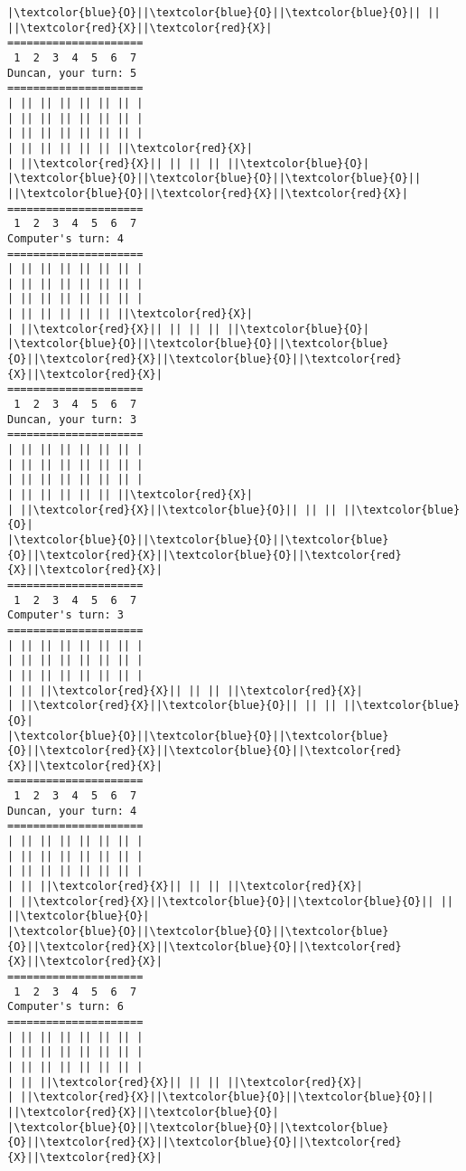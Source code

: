\documentclass{article}
\begin{document}
\begin{Verbatim}[commandchars=\\\{\}]
|\textcolor{blue}{O}||\textcolor{blue}{O}||\textcolor{blue}{O}|| || ||\textcolor{red}{X}||\textcolor{red}{X}|
=====================
 1  2  3  4  5  6  7
Duncan, your turn: 5
=====================
| || || || || || || |
| || || || || || || |
| || || || || || || |
| || || || || || ||\textcolor{red}{X}|
| ||\textcolor{red}{X}|| || || || ||\textcolor{blue}{O}|
|\textcolor{blue}{O}||\textcolor{blue}{O}||\textcolor{blue}{O}|| ||\textcolor{blue}{O}||\textcolor{red}{X}||\textcolor{red}{X}|
=====================
 1  2  3  4  5  6  7
Computer's turn: 4
=====================
| || || || || || || |
| || || || || || || |
| || || || || || || |
| || || || || || ||\textcolor{red}{X}|
| ||\textcolor{red}{X}|| || || || ||\textcolor{blue}{O}|
|\textcolor{blue}{O}||\textcolor{blue}{O}||\textcolor{blue}{O}||\textcolor{red}{X}||\textcolor{blue}{O}||\textcolor{red}{X}||\textcolor{red}{X}|
=====================
 1  2  3  4  5  6  7
Duncan, your turn: 3
=====================
| || || || || || || |
| || || || || || || |
| || || || || || || |
| || || || || || ||\textcolor{red}{X}|
| ||\textcolor{red}{X}||\textcolor{blue}{O}|| || || ||\textcolor{blue}{O}|
|\textcolor{blue}{O}||\textcolor{blue}{O}||\textcolor{blue}{O}||\textcolor{red}{X}||\textcolor{blue}{O}||\textcolor{red}{X}||\textcolor{red}{X}|
=====================
 1  2  3  4  5  6  7
Computer's turn: 3
=====================
| || || || || || || |
| || || || || || || |
| || || || || || || |
| || ||\textcolor{red}{X}|| || || ||\textcolor{red}{X}|
| ||\textcolor{red}{X}||\textcolor{blue}{O}|| || || ||\textcolor{blue}{O}|
|\textcolor{blue}{O}||\textcolor{blue}{O}||\textcolor{blue}{O}||\textcolor{red}{X}||\textcolor{blue}{O}||\textcolor{red}{X}||\textcolor{red}{X}|
=====================
 1  2  3  4  5  6  7
Duncan, your turn: 4
=====================
| || || || || || || |
| || || || || || || |
| || || || || || || |
| || ||\textcolor{red}{X}|| || || ||\textcolor{red}{X}|
| ||\textcolor{red}{X}||\textcolor{blue}{O}||\textcolor{blue}{O}|| || ||\textcolor{blue}{O}|
|\textcolor{blue}{O}||\textcolor{blue}{O}||\textcolor{blue}{O}||\textcolor{red}{X}||\textcolor{blue}{O}||\textcolor{red}{X}||\textcolor{red}{X}|
=====================
 1  2  3  4  5  6  7
Computer's turn: 6
=====================
| || || || || || || |
| || || || || || || |
| || || || || || || |
| || ||\textcolor{red}{X}|| || || ||\textcolor{red}{X}|
| ||\textcolor{red}{X}||\textcolor{blue}{O}||\textcolor{blue}{O}|| ||\textcolor{red}{X}||\textcolor{blue}{O}|
|\textcolor{blue}{O}||\textcolor{blue}{O}||\textcolor{blue}{O}||\textcolor{red}{X}||\textcolor{blue}{O}||\textcolor{red}{X}||\textcolor{red}{X}|

\end{Verbatim}
\end{document}
